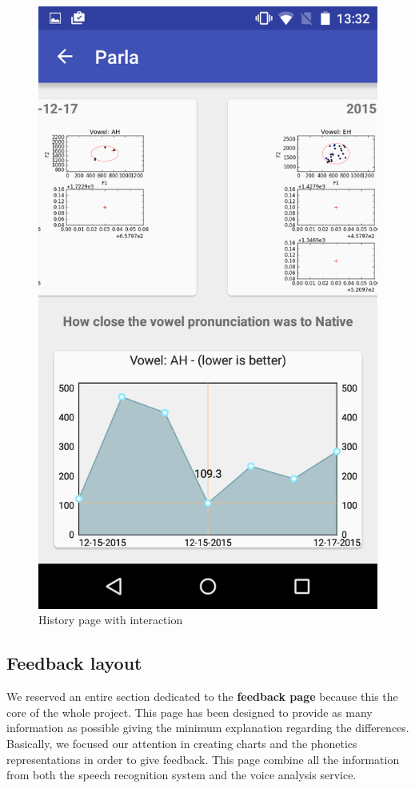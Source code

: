 \begin{figure}[!ht]
\begin{minipage}{.5\textwidth}
		\includegraphics[scale=0.18]{Figures/screenshots/history.png}
		\caption{History page with interaction}
		\label{fig:history_page}
	\end{minipage}
\end{figure}

\subsection{Feedback layout}
\label{ssec:feedback_layout}
We reserved an entire section dedicated to the \textbf{feedback page} because this the core of the whole project. This page has been designed to provide as many information as possible giving the minimum explanation regarding the differences. Basically, we focused our attention in creating charts and the phonetics representations in order to give feedback. This page combine all the information from both the speech recognition system and the voice analysis service. \\

